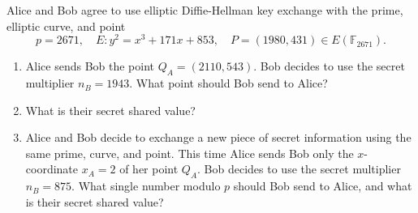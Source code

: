 \begin{exercise}{6.14}
    Alice and Bob agree to use elliptic Diffie-Hellman key exchange with the prime, elliptic curve, and point
    \[
    p = 2671, \quad E: y^2 = x^3 + 171x + 853, \quad P = (1980, 431) \in E(\mathbb{F}_{2671}).
    \]
    \begin{enumerate}
        \item Alice sends Bob the point \( Q_A = (2110, 543) \). Bob decides to use the secret multiplier \( n_B = 1943 \). What point should Bob send to Alice?
        \item What is their secret shared value?
        \setcounter{enumi}{3}
        \item Alice and Bob decide to exchange a new piece of secret information using the same prime, curve, and point. This time Alice sends Bob only the \( x \)-coordinate \( x_A = 2 \) of her point \( Q_A \). Bob decides to use the secret multiplier \( n_B = 875 \). 
        What single number modulo \(p\) should Bob send to Alice, and what is their secret shared value?
    \end{enumerate}
\end{exercise}

